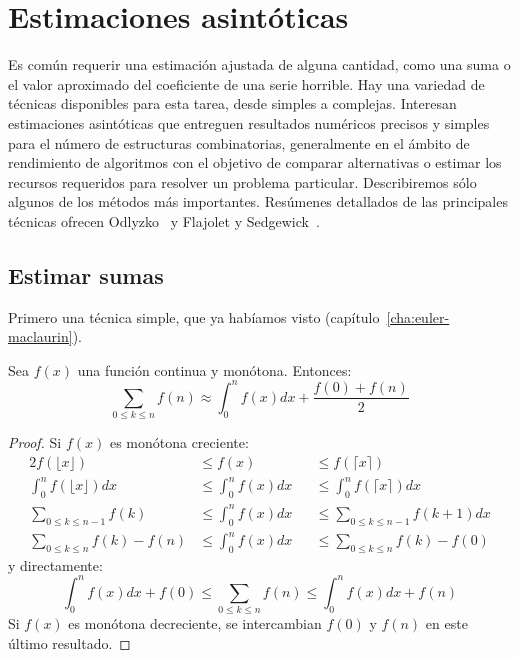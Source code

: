 %

\chapter{Estimaciones asintóticas}
\label{cha:estim-asint}

  Es común requerir una estimación ajustada de alguna cantidad,
  como una suma
  o el valor aproximado del coeficiente de una serie horrible.
  Hay una variedad de técnicas disponibles para esta tarea,
  desde simples a complejas.
  Interesan estimaciones asintóticas
  que entreguen resultados numéricos precisos y simples
  para el número de estructuras combinatorias,
  generalmente en el ámbito de rendimiento de algoritmos
  con el objetivo de comparar alternativas
  o estimar los recursos requeridos para resolver un problema particular.
  Describiremos sólo algunos de los métodos más importantes.
  Resúmenes detallados de las principales técnicas
  ofrecen Odlyzko~\cite{odlyzko95:_asympt_enum_method}
  y Flajolet y Sedgewick~\cite{flajolet09:_analy_combin}.

\section{Estimar sumas}
\label{sec:estimar-sumas}

  Primero una técnica simple,
  que ya habíamos visto
  (capítulo~\ref{cha:euler-maclaurin}).%
  \begin{theorem}
    \label{theo:sum-integral}
    Sea \(f(x)\) una función continua y monótona.
    Entonces:
    \begin{equation*}
      \sum_{0 \le k \le n} f(n)
	\approx \int_0^n f(x) d x
	    + \frac{f(0) + f(n)}{2}
    \end{equation*}
  \end{theorem}
  \begin{proof}
    Si \(f(x)\) es monótona creciente:
    \begin{alignat*}{2}
      f(\lfloor x \rfloor)
	&\le f(x)
	&&\le f(\lceil x \rceil) \\
     \int_0^n f(\lfloor x \rfloor) d x
	&\le \int_0^n f(x) d x
	&&\le \int_0^n f(\lceil x \rceil) d x \\
     \sum_{0 \le k \le n - 1} f(k)
	&\le \int_0^n f(x) d x
	&&\le \sum_{0 \le k \le n - 1} f(k + 1) d x \\
     \sum_{0 \le k \le n} f(k) - f(n)
	&\le \int_0^n f(x) d x
	&&\le \sum_{0 \le k \le n} f(k) - f(0)
    \end{alignat*}
    y directamente:
    \begin{equation*}
      \int_0^n f(x) d x + f(0)
	\le \sum_{0 \le k \le n} f(n)
	\le \int_0^n f(x) d x + f(n)
    \end{equation*}
    Si \(f(x)\) es monótona decreciente,
    se intercambian \(f(0)\) y \(f(n)\) en este último resultado.
  \end{proof}

